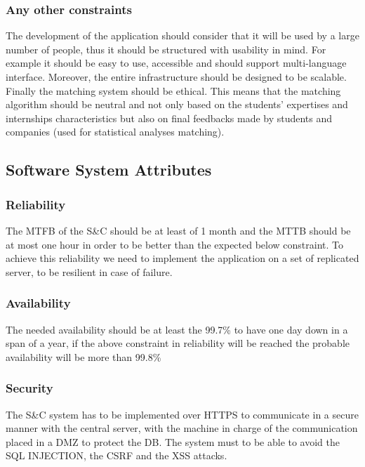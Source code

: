 \documentclass{article}
\begin{document}
\subsubsection{Any other constraints}
The development of the application should consider that it will be used by a large number of people, thus it should be structured with usability in mind. For example it should be easy to use, accessible and should support multi-language interface.
Moreover, the entire infrastructure should be designed to be scalable.
Finally the matching system should be ethical. This means that the matching algorithm should be neutral and not only based on the students' expertises and internships characteristics but also on final feedbacks made by students and companies (used for statistical analyses matching).

\subsection{Software System Attributes}

\subsubsection{Reliability}

The MTFB of the S\&C should be at least of 1 month and the MTTB should be at most one hour in order to be  better than the expected below constraint. To achieve this reliability we need to implement the application on a set of replicated server, to be resilient in case of failure. 

\subsubsection{Availability}

The needed availability should be at least the 99.7\% to have one day down in a span of a year, if the above constraint in reliability will be reached the probable availability will be more than 99.8\%

\subsubsection{Security}

The S\&C system has to be implemented over HTTPS to communicate in a secure manner with the central server, with the machine in charge of the communication placed in a DMZ to protect the DB. The system must to be able to avoid the SQL INJECTION, the CSRF and the XSS attacks.
\end{document}
